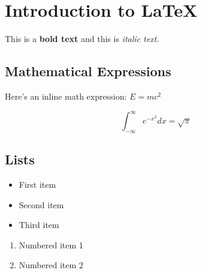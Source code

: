 \documentclass{article}
\begin{document}
\section{Introduction to LaTeX}

This is a \textbf{bold text} and this is \textit{italic text}.

\subsection{Mathematical Expressions}

Here's an inline math expression: $E = mc^2$

\begin{equation}
\int_{-\infty}^{\infty} e^{-x^2} dx = \sqrt{\pi}
\end{equation}

\subsection{Lists}

\begin{itemize}
\item First item
\item Second item
\item Third item
\end{itemize}

\begin{enumerate}
\item Numbered item 1
\item Numbered item 2
\end{enumerate}
\end{document}
